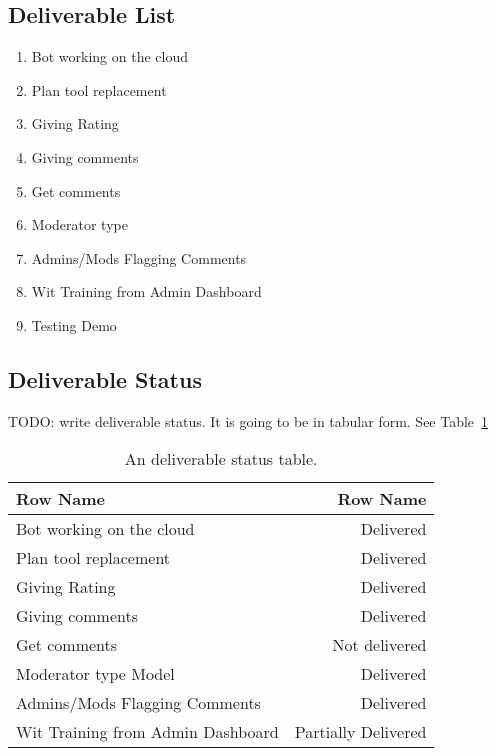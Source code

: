 \documentclass[a4paper]{article}
\begin{document}
\subsection{Deliverable List}

\begin{enumerate}

 	\item Bot working on the cloud
 	
 	\item Plan tool replacement
 	
    \item Giving Rating
    
    \item Giving comments
    
    \item Get comments
    
    \item Moderator type 
    
    \item Admins/Mods Flagging Comments
    
    \item Wit Training from Admin Dashboard
 	
 	\item Testing Demo	
 			
 \end{enumerate}

\subsection{Deliverable Status}
TODO: write deliverable status. It is going to be in tabular form. See Table~\ref{tab:deliverablestatus}

\begin{table}[h]
\centering
\begin{tabular}{l|r}
Row Name & Row Name \\\hline
Bot working on the cloud & Delivered \\
Plan tool replacement & Delivered \\
Giving Rating & Delivered \\
Giving comments & Delivered \\
Get comments & Not delivered \\
Moderator type Model & Delivered \\
Admins/Mods Flagging Comments & Delivered \\
Wit Training from Admin Dashboard & Partially Delivered \\

\end{tabular}
\caption{\label{tab:deliverablestatus}An deliverable status table.}
\end{table}
\end{document}
